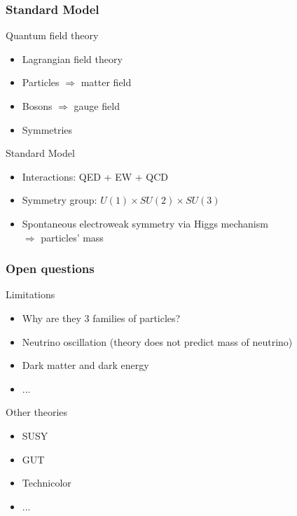 \documentclass{beamer}
\begin{document}
    \begin{frame}
      \frametitle{Standard Model}

      \begin{block}{Quantum field theory}
        \begin{itemize}
          \item Lagrangian field theory
          \item Particles $\Rightarrow$ matter field
          \item Bosons $\Rightarrow$ gauge field
          \item Symmetries
        \end{itemize}
      \end{block}

      \begin{block}{Standard Model}
        \begin{itemize}
          \item Interactions: QED + EW + QCD
          \item Symmetry group: $U(1) \times SU(2) \times SU(3)$
          \item Spontaneous electroweak symmetry via Higgs mechanism \\ $\Rightarrow$ particles' mass
        \end{itemize}
      \end{block}
    \end{frame}

    \begin{frame}
      \frametitle{Open questions}

      \begin{alertblock}{Limitations}
        \begin{itemize}
          \item Why are they 3 families of particles?
          \item Neutrino oscillation (theory does not predict mass of neutrino)
          \item Dark matter and dark energy
          \item ...
        \end{itemize}
      \end{alertblock}
      
      \begin{block}{Other theories}
        \begin{itemize}
          \item SUSY
          \item GUT
          \item Technicolor
          \item ...
        \end{itemize}
      \end{block}
    \end{frame}
     
\end{document}
